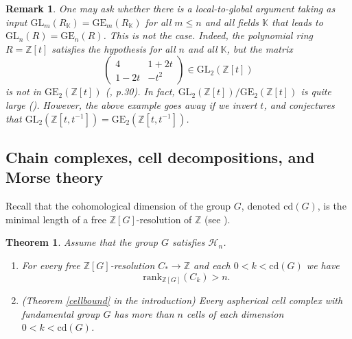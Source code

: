 \documentclass[11pt,letterpaper]{amsart}
\newtheorem{theorem}{Theorem}
\newtheorem*{remark}{Remark}
\begin{document}
\begin{remark}
One may ask whether there is a local-to-global argument taking as input $\mathrm{GL}_m(R_{\mathbb K})=\mathrm{GE}_m(R_{\mathbb K})$ for all $m\leq n$ and all fields $\mathbb K$ that leads to $\mathrm{GL}_n(R)=\mathrm{GE}_n(R)$. This is not the case. Indeed, the polynomial ring $R=\mathbb Z[t]$ satisfies the hypothesis for all $n$ and all $\mathbb K$, but the matrix
$$
\left(
\begin{array}{cc}
4&1+2t\\
1-2t&-t^2
\end{array}
\right)\in \mathrm{GL}_2(\mathbb Z[t])
$$
is not in $\mathrm{GE}_2(\mathbb Z[t])$ (\cite{cohngl}, p.30). In fact, $\mathrm{GL}_2(\mathbb Z[t])/\mathrm{GE}_2(\mathbb Z[t])$ is quite large (\cite{krsticmccool}). However, the above example goes away if we invert $t$, and \cite{abramenko} conjectures that 
$\mathrm{GL}_2(\mathbb Z[t,t^{-1}])=\mathrm{GE}_2(\mathbb Z[t,t^{-1}])$.
\end{remark}

\subsection{Chain complexes, cell decompositions, and Morse theory}
Recall that the cohomological dimension of the group $G$, denoted $\mathrm{cd}(G)$, is the minimal length of a free $\mathbb Z[G]$-resolution of $\mathbb Z$ (see \cite{brownbook}).   %

\begin{theorem}
\label{cdim}
Assume that the group $G$ satisfies $\mathcal{H}_{n}$. 
\begin{enumerate}
\item[1.]
For every free $\mathbb Z[G]$-resolution $C_*\rightarrow\mathbb Z$ and each $0<k<\mathrm{cd}(G)$ we have
$$
\mathrm{rank}_{\mathbb Z[G]}(C_k)>n.
$$
\item[2.](Theorem \ref{cellbound} in the introduction)
Every aspherical cell complex with fundamental group $G$ has more than $n$ cells of each dimension $0 < k < \mathrm{cd} (G)$.
\end{enumerate}
\end{theorem}
\end{document}
